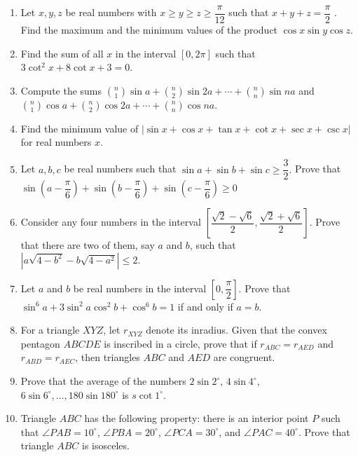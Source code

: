 \documentclass[12pt]{scrartcl}
\begin{document}
\begin{enumerate}
    \item Let $x, y, z$ be real numbers with $x\ge y\ge z\ge\dfrac{\pi}{12}$ such that $x+y+z=\dfrac{\pi}{2}$ . Find the maximum and the minimum values of the product $\cos x \sin y \cos z$.

    \item Find the sum of all $x$ in the interval $[0,2\pi]$ such that $3 \cot^{2}x+8 \cot x+3=0$.

    \item Compute the sums $\binom{n}{1}\sin a+\binom{n}{2}\sin 2a+\cdots+\binom{n}{n}\sin na$ and $\binom{n}{1}\cos a+\binom{n}{2}\cos 2a+\cdots+\binom{n}{n}\cos na.$
    
    \item Find the minimum value of $|\sin x+\cos x+\tan x+\cot x+\sec x+\csc x|$ for real numbers $x$.

    
    \item Let $a, b, c$ be real numbers such that $\sin a+\sin b+\sin c\ge\dfrac{3}{2}.$ Prove that $\sin\left(a-\dfrac{\pi}{6}\right)+\sin\left(b-\dfrac{\pi}{6}\right)+\sin\left(c-\dfrac{\pi}{6}\right)\ge0$
    
    \item Consider any four numbers in the interval $\left[\dfrac{\sqrt{2}-\sqrt{6}}{2},\dfrac{\sqrt{2}+\sqrt{6}}{2}\right]$. Prove that there are two of them, say $a$ and $b$, such that $\left|a\sqrt{4-b^{2}}-b\sqrt{4-a^{2}}\right|\le2.$
    
    \item Let $a$ and $b$ be real numbers in the interval $\left[0,\dfrac{\pi}{2}\right]$. Prove that $\sin^{6}a+3 \sin^{2}a \cos^{2}b+\cos^{6}b=1$ if and only if $a=b$.
    
    
    \item For a triangle $XYZ$, let $r_{XYZ}$ denote its inradius. Given that the convex pentagon $ABCDE$ is inscribed in a circle, prove that if $r_{ABC}=r_{AED}$ and $r_{ABD}=r_{AEC}$, then triangles $ABC$ and $AED$ are congruent.


    \item Prove that the average of the numbers $2 \sin 2^{\circ}$, $4 \sin 4^{\circ}$, $6 \sin 6^{\circ}, \dots, 180 \sin 180^{\circ}$ is $s \cot 1^{\circ}$.

    \item Triangle $ABC$ has the following property: there is an interior point $P$ such that $\angle PAB=10^{\circ}$, $\angle PBA=20^{\circ}$, $\angle PCA=30^{\circ}$, and $\angle PAC=40^{\circ}$. Prove that triangle $ABC$ is isosceles.
\end{enumerate}
\end{document}
